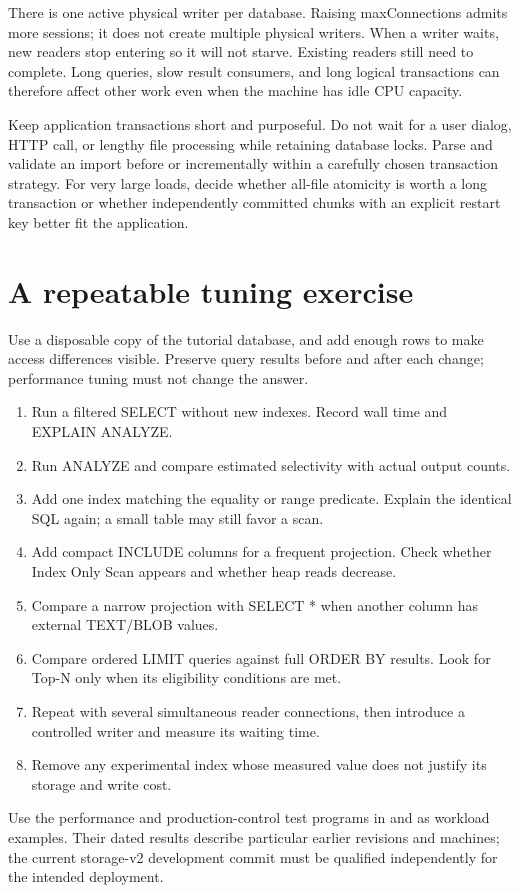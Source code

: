 There is one active physical writer per database. Raising maxConnections admits more sessions; it does not create multiple physical writers. When a writer waits, new readers stop entering so it will not starve. Existing readers still need to complete. Long queries, slow result consumers, and long logical transactions can therefore affect other work even when the machine has idle CPU capacity.

Keep application transactions short and purposeful. Do not wait for a user dialog, HTTP call, or lengthy file processing while retaining database locks. Parse and validate an import before or incrementally within a carefully chosen transaction strategy. For very large loads, decide whether all-file atomicity is worth a long transaction or whether independently committed chunks with an explicit restart key better fit the application.

\section{A repeatable tuning exercise}

Use a disposable copy of the tutorial database, and add enough rows to make access differences visible. Preserve query results before and after each change; performance tuning must not change the answer.

\begin{enumerate}
\item Run a filtered SELECT without new indexes. Record wall time and EXPLAIN ANALYZE.
\item Run ANALYZE and compare estimated selectivity with actual output counts.
\item Add one index matching the equality or range predicate. Explain the identical SQL again; a small table may still favor a scan.
\item Add compact INCLUDE columns for a frequent projection. Check whether Index Only Scan appears and whether heap reads decrease.
\item Compare a narrow projection with SELECT * when another column has external TEXT/BLOB values.
\item Compare ordered LIMIT queries against full ORDER BY results. Look for Top-N only when its eligibility conditions are met.
\item Repeat with several simultaneous reader connections, then introduce a controlled writer and measure its waiting time.
\item Remove any experimental index whose measured value does not justify its storage and write cost.
\end{enumerate}

Use the performance and production-control test programs in  and  as workload examples. Their dated results describe particular earlier revisions and machines; the current storage-v2 development commit must be qualified independently for the intended deployment.
